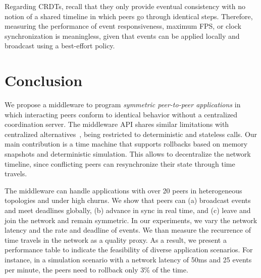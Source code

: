 \documentclass[10pt,journal,compsoc]{IEEEtran}
\begin{document}
Regarding CRDTs, recall that they only provide eventual consistency with no
notion of a shared timeline in which peers go through identical steps.
Therefore, measuring the performance of event responsiveness, maximum FPS, or
clock synchronization is meaningless, given that events can be applied locally
and broadcast using a best-effort policy.


\section{Conclusion}
\label{sec.conclusion}

We propose a middleware to program \emph{symmetric peer-to-peer applications}
in which interacting peers conform to identical behavior without a centralized
coordination server.
%
The middleware API shares similar limitations with centralized
alternatives~\cite{gals,croquet}, being restricted to deterministic and
stateless calls. %
%
Our main contribution is a time machine that supports rollbacks based on memory
snapshots and deterministic simulation.
This allows to decentralize the network timeline, since conflicting peers can
resynchronize their state through time travels.
%

The middleware can handle applications with over 20 peers in heterogeneous
topologies and under high churns.
%
We show that peers can
    (a) broadcast events and meet deadlines globally, 
    (b) advance in sync in real time, and
    (c) leave and join the network and remain symmetric.
%
In our experiments, we vary the network latency and the rate and deadline of
events.
We than measure the recurrence of time travels in the network as a quality
proxy.
%
As a result, we present a performance table to indicate the feasibility of
diverse application scenarios.
For instance, in a simulation scenario with a network latency of 50ms and 25
events per minute, the peers need to rollback only 3\% of the time.



\end{document}
